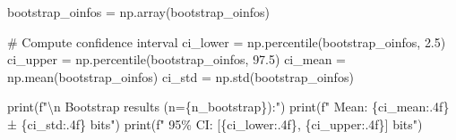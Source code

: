 \documentclass[
  11pt,
  letterpaper,
  oneside,
  openany]{book}
\newenvironment{Shaded}{\begin{snugshade}}{\end{snugshade}}
\newcommand{\BuiltInTok}[1]{\textcolor[rgb]{0.00,0.23,0.31}{#1}}
\newcommand{\CharTok}[1]{\textcolor[rgb]{0.13,0.47,0.30}{#1}}
\newcommand{\CommentTok}[1]{\textcolor[rgb]{0.37,0.37,0.37}{#1}}
\newcommand{\FloatTok}[1]{\textcolor[rgb]{0.68,0.00,0.00}{#1}}
\newcommand{\NormalTok}[1]{\textcolor[rgb]{0.00,0.23,0.31}{#1}}
\newcommand{\OperatorTok}[1]{\textcolor[rgb]{0.37,0.37,0.37}{#1}}
\newcommand{\SpecialCharTok}[1]{\textcolor[rgb]{0.37,0.37,0.37}{#1}}
\newcommand{\SpecialStringTok}[1]{\textcolor[rgb]{0.13,0.47,0.30}{#1}}
\begin{document}
\begin{Shaded}
\begin{Highlighting}[]
\NormalTok{bootstrap\_oinfos }\OperatorTok{=}\NormalTok{ np.array(bootstrap\_oinfos)}

\CommentTok{\# Compute confidence interval}
\NormalTok{ci\_lower }\OperatorTok{=}\NormalTok{ np.percentile(bootstrap\_oinfos, }\FloatTok{2.5}\NormalTok{)}
\NormalTok{ci\_upper }\OperatorTok{=}\NormalTok{ np.percentile(bootstrap\_oinfos, }\FloatTok{97.5}\NormalTok{)}
\NormalTok{ci\_mean }\OperatorTok{=}\NormalTok{ np.mean(bootstrap\_oinfos)}
\NormalTok{ci\_std }\OperatorTok{=}\NormalTok{ np.std(bootstrap\_oinfos)}

\BuiltInTok{print}\NormalTok{(}\SpecialStringTok{f"}\CharTok{\textbackslash{}n}\SpecialStringTok{   Bootstrap results (n=}\SpecialCharTok{\{}\NormalTok{n\_bootstrap}\SpecialCharTok{\}}\SpecialStringTok{):"}\NormalTok{)}
\BuiltInTok{print}\NormalTok{(}\SpecialStringTok{f"   Mean: }\SpecialCharTok{\{}\NormalTok{ci\_mean}\SpecialCharTok{:.4f\}}\SpecialStringTok{ ± }\SpecialCharTok{\{}\NormalTok{ci\_std}\SpecialCharTok{:.4f\}}\SpecialStringTok{ bits"}\NormalTok{)}
\BuiltInTok{print}\NormalTok{(}\SpecialStringTok{f"   95\% CI: [}\SpecialCharTok{\{}\NormalTok{ci\_lower}\SpecialCharTok{:.4f\}}\SpecialStringTok{, }\SpecialCharTok{\{}\NormalTok{ci\_upper}\SpecialCharTok{:.4f\}}\SpecialStringTok{] bits"}\NormalTok{)}


\end{Highlighting}
\end{Shaded}
\end{document}
